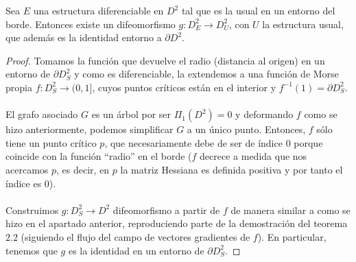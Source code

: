 \begin{hecho}
	Sea $E$ una estructura diferenciable en $D^2$ tal que es la usual en un entorno del borde. Entonces existe un difeomorfismo $g:D^2_E \rightarrow D^2_U$, con $U$ la estructura usual, que además es la identidad entorno a $\partial D^2$.
\end{hecho}

\begin{proof}
	Tomamos la función que devuelve el radio (distancia al origen) en un entorno de $\partial D^2_S$ y como es diferenciable, la extendemos a una función de Morse propia $f:D^2_S \rightarrow (0,1]$, cuyos puntos críticos están en el interior y $f^{-1}(1) = \partial D^2_S$.\\
	\\ El grafo asociado $G$ es un árbol por ser $\Pi_1(D^2) = 0$ y deformando $f$ como se hizo anteriormente, podemos simplificar $G$  a un único punto. Entonces, $f$ sólo tiene un punto crítico $p$, que necesariamente debe de ser de índice $0$ porque coincide con la función ``radio'' en el borde ($f$ decrece a medida que nos acercamos $p$, es decir, en $p$ la matriz Hessiana es definida positiva y por tanto el índice es $0$).\\
	\\ Construimos $g:D^2_S \rightarrow D^2$ difeomorfismo a partir de $f$ de manera similar a como se hizo en el apartado anterior, reproduciendo parte de la demostración del teorema $2.2$ (siguiendo el flujo del campo de vectores gradientes de $f$). En particular, tenemos que $g$ es la identidad en un entorno de $\partial D^2_S$.
\end{proof}



\endinput
